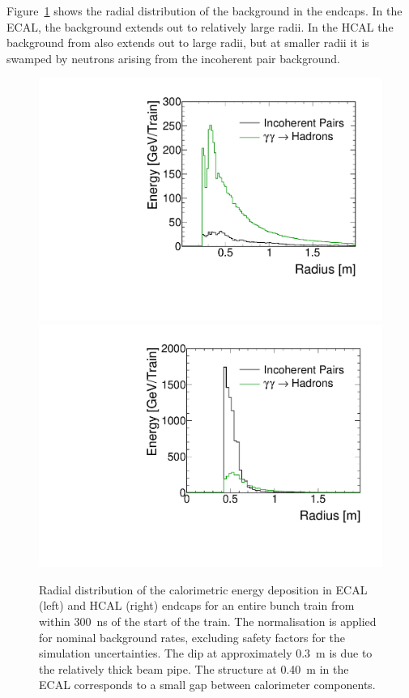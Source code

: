 Figure~\ref{fig:chap3:caloBackEnergyEnergy} shows the radial distribution of the
background in the endcaps. In the ECAL, the background extends out to relatively
large radii. In the HCAL the background from \gghadrons also extends out to
large radii, but at smaller radii it is swamped by neutrons arising from the incoherent pair
background. 
\begin{figure}[hbt]
\centering
\includegraphics[width=0.49\linewidth]{../Chap3_ExpCond_PhysPerfsReqs/ECalEnergyRadiusGandPMacro.pdf}
\includegraphics[width=0.49\linewidth]{../Chap3_ExpCond_PhysPerfsReqs/HCalEnergyRadiusGandPMacro.pdf}
 \caption{Radial distribution of the calorimetric energy deposition in \clicild ECAL (left) and HCAL (right) endcaps for an entire
 bunch train from within 300~ns of the start of the train. The normalisation is applied for nominal background
   rates, excluding safety factors for the simulation uncertainties.
The dip at approximately 0.3~m is due to the relatively thick
 beam pipe. The
 structure at 0.40~m in the ECAL corresponds to a small gap between calorimeter components. 
 \label{fig:chap3:caloBackEnergyEnergy}}

\end{figure}


